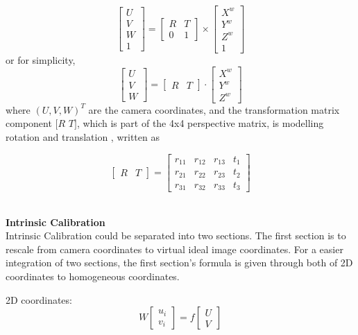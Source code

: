 \begin{equation}
%
\left[ \begin{array}{c} U \\ V \\ W \\ 1 \end{array} \right] %
= %
\begin{bmatrix} R & T \\ 0 & 1 \end{bmatrix} \times \left[ \begin{array}{c} X^w \\ Y^w \\ Z^w \\ 1 \end{array} \right]
%
\end{equation}%
%
or for simplicity,
\begin{equation}
%
\left[ \begin{array}{c} U \\ V \\ W \end{array} \right] %
= %
\begin{bmatrix} R & T \end{bmatrix} \cdot \left[ \begin{array}{c} X^w \\ Y^w \\ Z^w \end{array} \right]
\label{extrinsicTransform}
%
\end{equation}%
%
where \((U, V, W)^T\) are the camera coordinates, and the transformation matrix component \([R\)  \(T]\), which is part of the 4x4 perspective matrix, is modelling rotation and translation , written as

\begin{equation}
%
\left[ \begin{array}{cc} R & T \end{array} \right] %
= %
\begin{bmatrix}
 r_{11} & r_{12} & r_{13} & t_1 \\
 r_{21} & r_{22} & r_{23} & t_2 \\
 r_{31} & r_{32} & r_{33} & t_3
\end{bmatrix}
%
\end{equation}
\\\par
%
%
\textbf{Intrinsic Calibration}\\
Intrinsic Calibration could be separated into two sections. The first section is to rescale from camera coordinates to virtual ideal image coordinates. For a easier integration of two sections, the first section's formula is given through both of 2D coordinates to homogeneous coordinates.\par
%
\quad\quad2D coordinates:%
\begin{equation}
%
W \left[ \begin{array}{c} u_i \\ v_i  \end{array} \right] %
= f %
\left[ \begin{array}{c} U \\ V \end{array} \right]%
%
\end{equation}

